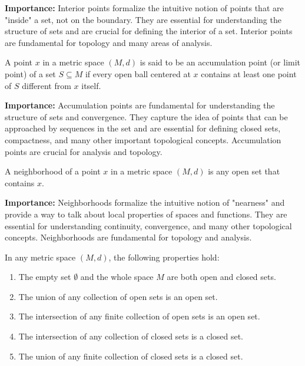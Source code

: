 \noindent\textbf{Importance:} Interior points formalize the intuitive notion of points that are "inside" a set, not on the boundary. They are essential for understanding the structure of sets and are crucial for defining the interior of a set. Interior points are fundamental for topology and many areas of analysis.



\begin{definition}
A point $x$ in a metric space $(M,d)$ is said to be an accumulation point (or limit point) of a set $S \subseteq M$ if every open ball centered at $x$ contains at least one point of $S$ different from $x$ itself.
\end{definition}

\noindent\textbf{Importance:} Accumulation points are fundamental for understanding the structure of sets and convergence. They capture the idea of points that can be approached by sequences in the set and are essential for defining closed sets, compactness, and many other important topological concepts. Accumulation points are crucial for analysis and topology.



\begin{definition}[Neighborhood]
A neighborhood of a point $x$ in a metric space $(M,d)$ is any open set that contains $x$.
\end{definition}

\noindent\textbf{Importance:} Neighborhoods formalize the intuitive notion of "nearness" and provide a way to talk about local properties of spaces and functions. They are essential for understanding continuity, convergence, and many other topological concepts. Neighborhoods are fundamental for topology and analysis.



\begin{theorem}
In any metric space $(M,d)$, the following properties hold:
\begin{enumerate}
\item The empty set $\emptyset$ and the whole space $M$ are both open and closed sets.
\item The union of any collection of open sets is an open set.
\item The intersection of any finite collection of open sets is an open set.
\item The intersection of any collection of closed sets is a closed set.
\item The union of any finite collection of closed sets is a closed set.
\end{enumerate}
\end{theorem}

